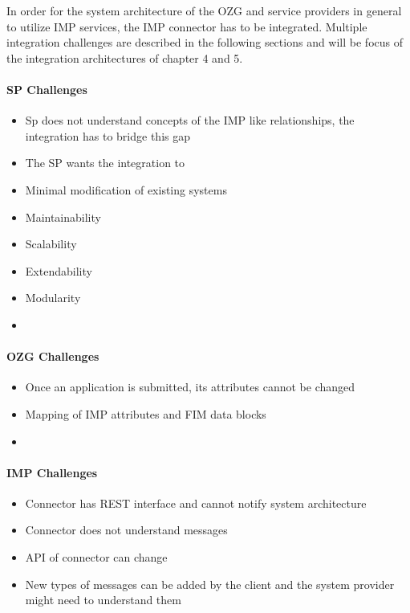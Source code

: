 In order for the system architecture of the OZG and service providers in general to utilize IMP services, the IMP connector has to be integrated. Multiple integration challenges are described in the following sections and will be focus of the integration architectures of chapter 4 and 5.


\paragraph{SP Challenges}

\begin{itemize}
    \item Sp does not understand concepts of the IMP like relationships, the integration has to bridge this gap
    \item The SP wants the integration to 
    \item Minimal modification of existing systems
    \item Maintainability
    \item Scalability
    \item Extendability
    \item Modularity
    \item 
    
\end{itemize}

\paragraph{OZG Challenges}

\begin{itemize}
    \item Once an application is submitted, its attributes cannot be changed
    \item Mapping of IMP attributes and FIM data blocks
    \item 
\end{itemize}

\paragraph{IMP Challenges}

\begin{itemize}
    \item Connector has REST interface and cannot notify system architecture
    \item Connector does not understand messages
    \item API of connector can change
    \item New types of messages can be added by the client and the system provider might need to understand them
\end{itemize}




